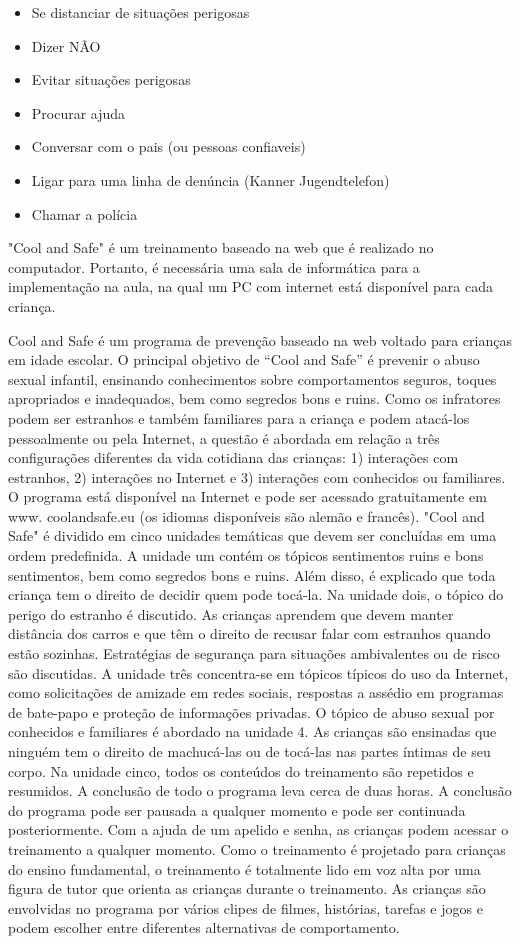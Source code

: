 \begin{itemize}
  \item Se distanciar de situações perigosas
  \item Dizer NÃO
  \item Evitar situações perigosas
  \item Procurar ajuda
  \item Conversar com o pais (ou pessoas confiaveis)
  \item Ligar para uma linha de denúncia (Kanner Jugendtelefon)
  \item Chamar a polícia
\end{itemize}

"Cool and Safe" é um treinamento baseado na web que é realizado no computador. Portanto, é necessária uma sala de informática para a implementação na aula, na qual um PC com internet está disponível para cada criança.

Cool and Safe é um programa de prevenção baseado na web voltado para crianças em idade escolar. O principal objetivo de “Cool and Safe” é prevenir o abuso sexual infantil, ensinando conhecimentos sobre comportamentos seguros, toques apropriados e inadequados, bem como segredos bons e ruins. Como os infratores podem ser estranhos e também familiares para a criança e podem atacá-los pessoalmente ou pela Internet, a questão é abordada em relação a três configurações diferentes da vida cotidiana das crianças: 1) interações com estranhos, 2) interações no Internet e 3) interações com conhecidos ou familiares. O programa está disponível na Internet e pode ser acessado gratuitamente em www. coolandsafe.eu (os idiomas disponíveis são alemão e francês). "Cool and Safe" é dividido em cinco unidades temáticas que devem ser concluídas em uma ordem predefinida. A unidade um contém os tópicos sentimentos ruins e bons sentimentos, bem como segredos bons e ruins. Além disso, é explicado que toda criança tem o direito de decidir quem pode tocá-la. Na unidade dois, o tópico do perigo do estranho é discutido. As crianças aprendem que devem manter distância dos carros e que têm o direito de recusar falar com estranhos quando estão sozinhas. Estratégias de segurança para situações ambivalentes ou de risco são discutidas. A unidade três concentra-se em tópicos típicos do uso da Internet, como solicitações de amizade em redes sociais, respostas a assédio em programas de bate-papo e proteção de informações privadas. O tópico de abuso sexual por conhecidos e familiares é abordado na unidade 4. As crianças são ensinadas que ninguém tem o direito de machucá-las ou de tocá-las nas partes íntimas de seu corpo. Na unidade cinco, todos os conteúdos do treinamento são repetidos e resumidos. A conclusão de todo o programa leva cerca de duas horas. A conclusão do programa pode ser pausada a qualquer momento e pode ser continuada posteriormente. Com a ajuda de um apelido e senha, as crianças podem acessar o treinamento a qualquer momento. Como o treinamento é projetado para crianças do ensino fundamental, o treinamento é totalmente lido em voz alta por uma figura de tutor que orienta as crianças durante o treinamento. As crianças são envolvidas no programa por vários clipes de filmes, histórias, tarefas e jogos e podem escolher entre diferentes alternativas de comportamento.

